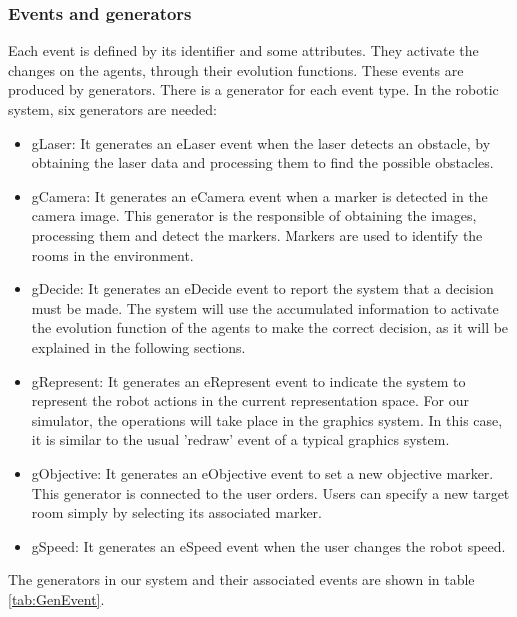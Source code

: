 \documentclass{aamas2012}
\begin{document}
\subsubsection{Events and generators}

Each event is defined by its identifier and some attributes. They activate the changes on the agents, through their evolution functions. 
These events are produced by generators. There is a generator for each event type. In the robotic system, six generators are needed:
\begin{itemize}
\item gLaser: It generates an eLaser event when the laser detects an obstacle, by obtaining the laser data and processing them to find the possible obstacles.
\item gCamera: It generates an eCamera event when a marker is detected in the camera image. This generator is the responsible of obtaining the images, processing them and detect the markers. Markers are used to identify the rooms in the environment.
\item gDecide: It generates an eDecide event to report the system that a decision must be made. The system will use the accumulated information to activate the evolution function of the agents to make the correct decision, as it will be explained in the following sections.
\item gRepresent: It generates an eRepresent event to indicate the system to represent the robot actions in the current representation space. For our simulator, the operations will take place in the graphics system. In this case, it is similar to the usual 'redraw' event of a typical graphics system.
\item gObjective: It generates an eObjective event to set a new objective marker. This generator is connected to the user orders. Users can specify a new target room simply by selecting its associated marker.
\item gSpeed: It generates an eSpeed event when the user changes the robot speed.
\end{itemize}

The generators in our system and their associated events are shown in table \ref {tab:GenEvent}.
\end{document}
